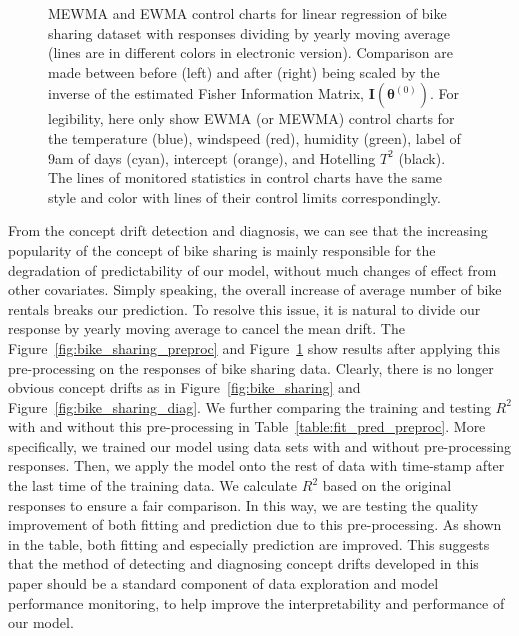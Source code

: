 \documentclass[twoside,11pt]{article}
\begin{document}
\begin{figure}[!htbp]
  \caption{
  MEWMA and EWMA control charts for linear regression of bike sharing dataset with responses dividing by yearly moving average (lines are in different colors in electronic version). Comparison are made between before (left) and after (right) being scaled by the inverse of the estimated Fisher Information Matrix, $\mathbf {I} ( {\bm{\theta}} ^{(0)})$. For legibility, here only show EWMA (or MEWMA) control charts for the temperature (blue), windspeed (red), humidity (green), label of $9$am of days (cyan), intercept (orange), and Hotelling $T^2$ (black). The lines of monitored statistics in control charts have the same style and color with lines of their control limits correspondingly.
}
\label{fig:bike_sharing_preproc_diag}
\end{figure}

From the concept drift detection and diagnosis, we can see that the increasing popularity of the concept of bike sharing is mainly responsible for the degradation of predictability of our model, without much changes of effect from other covariates. Simply speaking, the overall increase of average number of bike rentals breaks our prediction. To resolve this issue, it is natural to divide our response by yearly moving average to cancel the mean drift. The Figure~\ref{fig:bike_sharing_preproc} and Figure~\ref{fig:bike_sharing_preproc_diag} show results after applying this pre-processing on the responses of bike sharing data. Clearly, there is no longer obvious concept drifts as in Figure~\ref{fig:bike_sharing} and Figure~\ref{fig:bike_sharing_diag}. We further comparing the training and testing $R^2$ with and without this pre-processing in Table~\ref{table:fit_pred_preproc}. More specifically, we trained our model using data sets with and without pre-processing responses. Then, we apply the model onto the rest of data with time-stamp after the last time of the training data. We calculate $R^2$ based on the original responses to ensure a fair comparison. In this way, we are testing the quality improvement of both fitting and prediction due to this pre-processing. As shown in the table, both fitting and especially prediction are improved. This suggests that the method of detecting and diagnosing concept drifts developed in this paper should be a standard component of data exploration and model performance monitoring, to help improve the interpretability and performance of our model.
\end{document}
